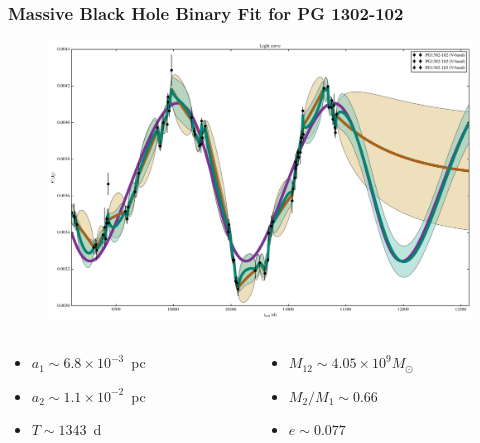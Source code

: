 \documentclass[hyperref={pdfpagelabels=false}]{beamer}
\begin{document}
\begin{frame}
\frametitle{Massive Black Hole Binary Fit for PG 1302-102}
  \begin{figure}
    \includegraphics[scale=0.05]{images/PG1302-102_LC.jpg}
  \end{figure}
  \begin{columns}
  \centering
    \begin{column}{0.5\textwidth}
      \begin{itemize}
        \item {\scriptsize $a_{1} \sim 6.8 \times 10^{-3}$~pc}
        \item {\scriptsize $a_{2} \sim 1.1 \times 10^{-2}$~pc}
        \item {\scriptsize $T \sim 1343$~d}
      \end{itemize}
    \end{column}
    \begin{column}{0.5\textwidth}
      \begin{itemize}
        \item {\scriptsize $M_{12} \sim 4.05 \times 10^{9} M_{\odot}$}
        \item {\scriptsize $M_{2}/M_{1} \sim 0.66$}
        \item {\scriptsize $e \sim 0.077$}
      \end{itemize}
    \end{column}
  \end{columns}
\end{frame}

\appendix
\begin{frame}[allowframebreaks]
  
\end{frame}
\end{document}
